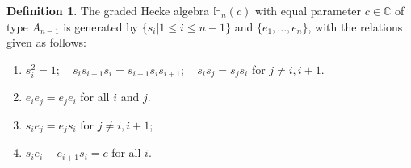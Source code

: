 \documentclass[11pt]{amsart}
\numberwithin{equation}{section}
\theoremstyle{definition}
\newtheorem{definition}[thm]{Definition}
\begin{document}






\begin{definition} \label{def graded hecke type A}
   The graded Hecke algebra $\mathbb{H}_{n}(c)$ with equal parameter $c \in \mathbb C$ of type $A_{n-1}$ is generated by $\{s_{i}|1\leq i\leq n-1\}$ and $\{e_{1},...,e_{n}\}$,  with the relations given as follows:
   \begin{enumerate}
       \item[(1)] $s_{i}^{2}=1;\quad s_{i}s_{i+1}s_{i}=s_{i+1}s_{i}s_{i+1};\quad s_{i}s_{j}=s_{j}s_{i}$ for $j\neq i,i+1$.
       \item[(2)] $e_{i}e_{j}=e_{j}e_{i}$ for all $i$ and $j$.
       \item[(3)] $s_{i}e_{j}=e_{j}s_{i}$ for $j\neq i,i+1$;
       \item[(4)] $s_{i}e_{i}-e_{i+1}s_{i}=c$ for all $i$. 
   \end{enumerate}
\end{definition}
\end{document}
